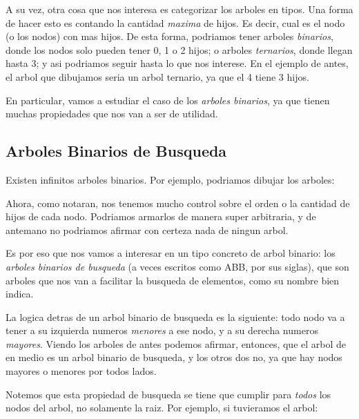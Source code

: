 \documentclass{article}
\begin{document}
A su vez, otra cosa que nos interesa es categorizar los arboles en tipos. Una forma de hacer esto es contando la cantidad \textit{maxima} de hijos. Es decir, cual es el nodo (o los nodos) con mas hijos. De esta forma, podriamos tener arboles \textit{binarios}, donde los nodos solo pueden tener 0, 1 o 2 hijos; o arboles \textit{ternarios}, donde llegan hasta 3; y asi podriamos seguir hasta lo que nos interese. En el ejemplo de antes, el arbol que dibujamos seria un arbol ternario, ya que el 4 tiene 3 hijos.

En particular, vamos a estudiar el caso de los \textit{arboles binarios}, ya que tienen muchas propiedades que nos van a ser de utilidad.

\subsection{Arboles Binarios de Busqueda}

Existen infinitos arboles binarios. Por ejemplo, podriamos dibujar los arboles:

\begin{multicols}{3}
				
				
\end{multicols}

Ahora, como notaran, nos tenemos mucho control sobre el orden o la cantidad de hijos de cada nodo. Podriamos armarlos de manera super arbitraria, y de antemano no podriamos afirmar con certeza nada de ningun arbol.

Es por eso que nos vamos a interesar en un tipo concreto de arbol binario: los \textit{arboles binarios de busqueda} (a veces escritos como ABB, por sus siglas), que son arboles que nos van a facilitar la busqueda de elementos, como su nombre bien indica.

La logica detras de un arbol binario de busqueda es la siguiente: todo nodo va a tener a su izquierda numeros \textit{menores} a ese nodo, y a su derecha numeros \textit{mayores}. Viendo los arboles de antes podemos afirmar, entonces, que el arbol de en medio es un arbol binario de busqueda, y los otros dos no, ya que hay nodos mayores o menores por todos lados.

Notemos que esta propiedad de busqueda se tiene que cumplir para \textit{todos} los nodos del arbol, no solamente la raiz. Por ejemplo, si tuvieramos el arbol:
\end{document}
